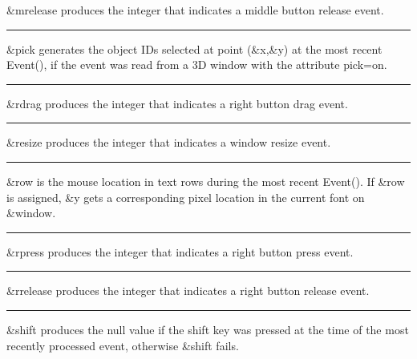 \noindent
\textsf{\&mrelease} produces the integer that indicates a middle button
release event.

\bigskip\hrule\vspace{0.1cm}

\noindent
\textsf{\&pick} generates the object IDs selected at point
(\textsf{\&x},\textsf{\&y}) at the most recent \textsf{Event()}, if the
event was read from a 3D window with the attribute \textsf{pick=on}.

\bigskip\hrule\vspace{0.1cm}

\noindent
\textsf{\&rdrag} produces the integer that indicates a right button drag
event.

\bigskip\hrule\vspace{0.1cm}

\noindent
\textsf{\&resize} produces the integer that indicates a window resize
event.

\bigskip\hrule\vspace{0.1cm}

\noindent
\textsf{\&row} is the mouse location in text rows during the most recent
\textsf{Event()}. If \textsf{\&row} is assigned, \textsf{\&y} gets a
corresponding pixel location in the current font on \textsf{\&window}.

\bigskip\hrule\vspace{0.1cm}

\noindent
\textsf{\&rpress} produces the integer that indicates a right button
press event.

\bigskip\hrule\vspace{0.1cm}

\noindent
\textsf{\&rrelease} produces the integer that indicates a right button
release event.

\bigskip\hrule\vspace{0.1cm}

\noindent
\textsf{\&shift} produces the null value if the shift key was pressed at
the time of the most recently processed event, otherwise
\textsf{\&shift} fails.

